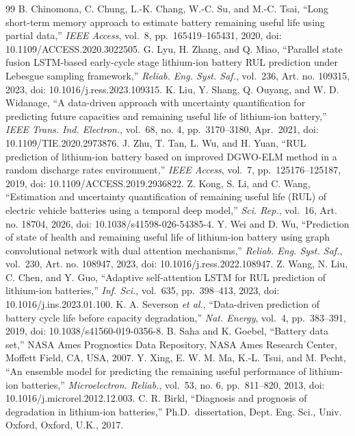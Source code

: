 \documentclass[journal]{IEEEtran}
\begin{document}
\begin{thebibliography}{99}
 B. Chinomona, C. Chung, L.-K. Chang, W.-C. Su, and M.-C. Tsai, ``Long short-term memory approach to estimate battery remaining useful life using partial data,'' \emph{IEEE Access}, vol.~8, pp.~165419--165431, 2020, doi: 10.1109/ACCESS.2020.3022505.
 G. Lyu, H. Zhang, and Q. Miao, ``Parallel state fusion LSTM-based early-cycle stage lithium-ion battery RUL prediction under Lebesgue sampling framework,'' \emph{Reliab. Eng. Syst. Saf.}, vol.~236, Art. no. 109315, 2023, doi: 10.1016/j.ress.2023.109315.
 K. Liu, Y. Shang, Q. Ouyang, and W. D. Widanage, ``A data-driven approach with uncertainty quantification for predicting future capacities and remaining useful life of lithium-ion battery,'' \emph{IEEE Trans. Ind. Electron.}, vol.~68, no. 4, pp.~3170--3180, Apr.~2021, doi: 10.1109/TIE.2020.2973876.
 J. Zhu, T. Tan, L. Wu, and H. Yuan, ``RUL prediction of lithium-ion battery based on improved DGWO-ELM method in a random discharge rates environment,'' \emph{IEEE Access}, vol.~7, pp.~125176--125187, 2019, doi: 10.1109/ACCESS.2019.2936822.
 Z. Kong, S. Li, and C. Wang, ``Estimation and uncertainty quantification of remaining useful life (RUL) of electric vehicle batteries using a temporal deep model,'' \emph{Sci. Rep.}, vol.~16, Art. no. 18704, 2026, doi: 10.1038/s41598-026-54385-4.
 Y. Wei and D. Wu, ``Prediction of state of health and remaining useful life of lithium-ion battery using graph convolutional network with dual attention mechanisms,'' \emph{Reliab. Eng. Syst. Saf.}, vol.~230, Art. no. 108947, 2023, doi: 10.1016/j.ress.2022.108947.
 Z. Wang, N. Liu, C. Chen, and Y. Guo, ``Adaptive self-attention LSTM for RUL prediction of lithium-ion batteries,'' \emph{Inf. Sci.}, vol.~635, pp.~398--413, 2023, doi: 10.1016/j.ins.2023.01.100.
 K. A. Severson \emph{et al.}, ``Data-driven prediction of battery cycle life before capacity degradation,'' \emph{Nat. Energy}, vol.~4, pp.~383--391, 2019, doi: 10.1038/s41560-019-0356-8.
 B. Saha and K. Goebel, ``Battery data set,'' NASA Ames Prognostics Data Repository, NASA Ames Research Center, Moffett Field, CA, USA, 2007.
 Y. Xing, E. W. M. Ma, K.-L. Tsui, and M. Pecht, ``An ensemble model for predicting the remaining useful performance of lithium-ion batteries,'' \emph{Microelectron. Reliab.}, vol.~53, no. 6, pp.~811--820, 2013, doi: 10.1016/j.microrel.2012.12.003.
 C. R. Birkl, ``Diagnosis and prognosis of degradation in lithium-ion batteries,'' Ph.D.~dissertation, Dept. Eng. Sci., Univ. Oxford, Oxford, U.K., 2017.

\end{thebibliography}
\end{document}
